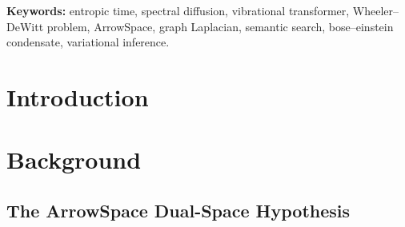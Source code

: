 \documentclass[11pt]{article}
\newcommand{\ESDM}{\textsc{esdm}}
\begin{document}
\begin{abstract}
The resulting architecture has no external epoch counter, no preset number of
diffusion steps, and no fixed noise schedule: its temporal structure emerges
entirely from the internal thermodynamics of the dual-space semantic system.
Training phases (big bang, expansion, maximum extension, big crunch, heat
death) map onto identifiable regimes of the spectral diagnostics, and a
\texttt{kl\_S} barrier-height sweep directly reproduces the topological
transition structure of Barontini's Fig.~2.
We argue that this construction formalises the ArrowSpace dual-space
hypothesis -- every vector space is simultaneously a geometric item-space and
a semantic feature-space -- as a thermodynamic duality, and that optimisation
in the \ESDM is equivalently a \emph{recursive semantic search} over the
spectral geometry of the corpus.

\end{abstract}

\vspace{1em}
\noindent\textbf{Keywords:} entropic time, spectral diffusion, vibrational transformer,
Wheeler--DeWitt problem, ArrowSpace, graph Laplacian, semantic search,
bose--einstein condensate, variational inference.

\newpage

\tableofcontents

\newpage

\section{Introduction}
\label{sec:introduction}

\section{Background}
\label{sec:background}

  \subsection{The ArrowSpace Dual-Space Hypothesis}
  \label{sec:arrowspace}
\end{document}
